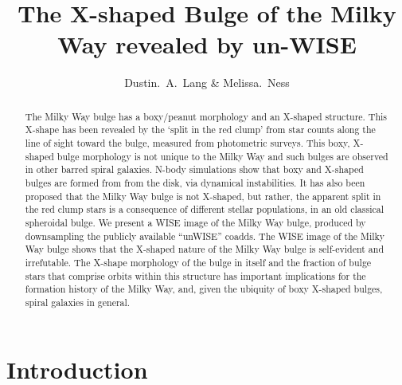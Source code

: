 \documentclass[12pt, preprint]{aastex}
\begin{document}
\title{The X-shaped Bulge of the Milky Way revealed by un-WISE} 
\author{%
Dustin.~A.~Lang \& 
Melissa.~Ness
}
%
\begin{abstract}%
The Milky Way bulge has a boxy/peanut morphology and an X-shaped structure. This X-shape has been revealed by the `split in the red clump' from 
star counts along the line of sight toward the bulge, measured from photometric surveys. This boxy, X-shaped bulge morphology is not unique to the Milky Way and such bulges are observed in other barred spiral galaxies.  N-body simulations show that boxy and X-shaped bulges are formed from from the disk, via dynamical instabilities.  It has also been proposed that the Milky Way bulge is not X-shaped, but rather, the apparent split in the red clump stars is a consequence of different stellar populations, in an old classical spheroidal bulge. We present a WISE image of the Milky Way bulge, produced by downsampling the publicly available ``unWISE'' coadds. The WISE image of the Milky Way bulge shows that the X-shaped nature of the Milky Way bulge is self-evident and irrefutable. The X-shape morphology of the bulge in itself and the fraction of bulge stars that comprise orbits within this structure has important implications for the formation history of the Milky Way, and, given the ubiquity of boxy X-shaped bulges, spiral galaxies in general. 
\end{abstract}



\keywords{%
}

\section{Introduction}\label{sec:Intro}
\end{document}
